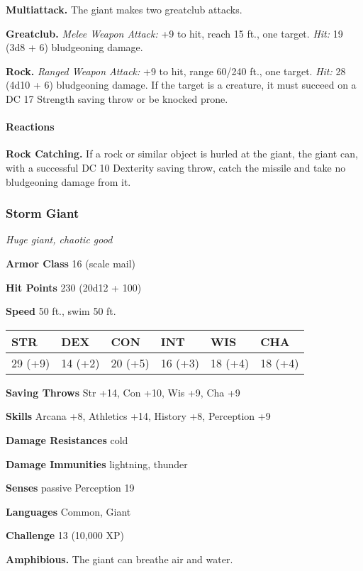 \documentclass[
]{article}
\begin{document}
\textbf{Multiattack.} The giant makes two greatclub attacks.

\textbf{Greatclub.} \emph{Melee Weapon Attack:} +9 to hit, reach 15 ft.,
one target. \emph{Hit:} 19 (3d8 + 6) bludgeoning damage.

\textbf{Rock.} \emph{Ranged Weapon Attack:} +9 to hit, range 60/240 ft.,
one target. \emph{Hit:} 28 (4d10 + 6) bludgeoning damage. If the target
is a creature, it must succeed on a DC 17 Strength saving throw or be
knocked prone.

\hypertarget{reactions}{%
\paragraph{Reactions}\label{reactions}}

\textbf{Rock Catching.} If a rock or similar object is hurled at the
giant, the giant can, with a successful DC 10 Dexterity saving throw,
catch the missile and take no bludgeoning damage from it.

\hypertarget{storm-giant}{%
\subsubsection{Storm Giant}\label{storm-giant}}

\emph{Huge giant, chaotic good}

\textbf{Armor Class} 16 (scale mail)

\textbf{Hit Points} 230 (20d12 + 100)

\textbf{Speed} 50 ft., swim 50 ft.

\begin{longtable}[]{@{}llllll@{}}
\toprule
STR & DEX & CON & INT & WIS & CHA\tabularnewline
\midrule
\endhead
29 (+9) & 14 (+2) & 20 (+5) & 16 (+3) & 18 (+4) & 18 (+4)\tabularnewline
\bottomrule
\end{longtable}

\textbf{Saving Throws} Str +14, Con +10, Wis +9, Cha +9

\textbf{Skills} Arcana +8, Athletics +14, History +8, Perception +9

\textbf{Damage Resistances} cold

\textbf{Damage Immunities} lightning, thunder

\textbf{Senses} passive Perception 19

\textbf{Languages} Common, Giant

\textbf{Challenge} 13 (10,000 XP)

\textbf{Amphibious.} The giant can breathe air and water.
\end{document}
